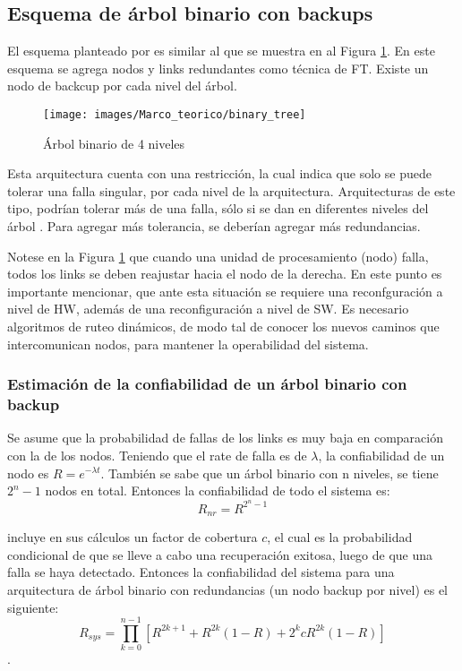 \subsection{Esquema de árbol binario con backups}
El esquema planteado por \cite{Raghavendra84} es similar al que se muestra en al Figura 
\ref{fig:binary_tree}. En este esquema se agrega nodos y links redundantes como técnica de \ac{FT}. 
Existe un nodo de backcup por cada nivel del árbol.

\begin{figure}[h]
 \centering
 \texttt{[image: images/Marco\_teorico/binary\_tree]}
  \caption{Árbol binario de 4 niveles}  
\label{fig:binary_tree} 
\end{figure}

Esta arquitectura cuenta con una restricción, la cual indica que solo se puede tolerar una 
falla singular, por cada nivel de la arquitectura. Arquitecturas de este tipo, podrían tolerar más 
de una falla, sólo si se dan en diferentes niveles del árbol \citep{Raghavendra84}. Para agregar 
más tolerancia, se deberían agregar más redundancias.

Notese en la Figura \ref{fig:binary_tree} que cuando una unidad de procesamiento (nodo) falla, 
todos los links se deben reajustar hacia el nodo de la derecha. En este punto es importante 
mencionar, que ante esta situación se requiere una reconfguración a nivel de \ac{HW}, además de una 
reconfiguración a nivel de \ac{SW}. Es necesario algoritmos de ruteo dinámicos, de modo tal de 
conocer los nuevos caminos que intercomunican nodos, para mantener la operabilidad del sistema.  

\subsubsection{Estimación de la confiabilidad de un árbol binario con backup}
Se asume que la probabilidad de fallas de los links es muy baja en comparación con la de los nodos. 
Teniendo que el rate de falla es de $\lambda$, la confiabilidad  de un nodo es $R = e^{-\lambda 
t}$. También se sabe que un árbol binario con n niveles, se tiene $2^n - 1$ nodos en total. 
Entonces la confiabilidad de todo el sistema es: $$R_{nr} = R^{2^n - 1}$$

\cite{Raghavendra84} incluye en sus cálculos un factor de cobertura $c$, el cual es la probabilidad 
condicional de que se lleve a cabo una recuperación exitosa, luego de que una falla se haya 
detectado. Entonces la confiabilidad del sistema para una arquitectura de árbol binario con 
redundancias (un nodo backup por nivel) es el siguiente: $$R_{sys} = \prod_{k=0}^{n-1}{[R^{2k +1} + 
R^{2k}(1-R) + 2^kcR^{2k}(1-R)]}$$.

